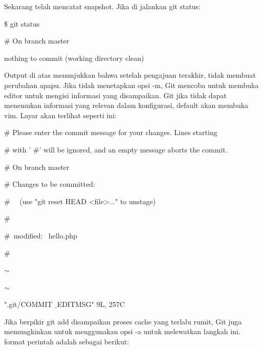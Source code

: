 \vspace{12pt}
Sekarang telah mencatat snapshot. Jika di jalankan git status:  \par
\noindent 
{\fontsize{10pt}{10pt}\selectfont  $  \$  $ git status} \par
\noindent 
{\fontsize{10pt}{10pt}\selectfont  $  \#  $ On branch master} \par
\noindent 
{\fontsize{10pt}{10pt}\selectfont nothing to commit (working directory clean)} \par
\vspace{12pt}
\hspace*{0.5in} Output di atas menunjukkan bahwa setelah pengajuan terakhir, tidak membuat perubahan apapu. Jika tidak menetapkan opsi -m, Git mencoba untuk membuka editor untuk mengisi informasi yang disampaikan. Git jika tidak dapat menemukan informasi yang relevan dalam konfigurasi, default akan membuka vim. Layar akan terlihat seperti ini:  \par
\noindent 
{\fontsize{10pt}{10pt}\selectfont  $  \#  $ Please enter the commit message for your changes. Lines starting} \par
\noindent 
{\fontsize{10pt}{10pt}\selectfont  $  \#  $ with ' $  \#  $' will be ignored, and an empty message aborts the commit.} \par
\noindent 
{\fontsize{10pt}{10pt}\selectfont  $  \#  $ On branch master} \par
\noindent 
{\fontsize{10pt}{10pt}\selectfont  $  \#  $ Changes to be committed:} \par
\noindent 
{\fontsize{10pt}{10pt}\selectfont  $  \#  $~~ (use "git reset HEAD <file>..." to unstage)} \par
\noindent 
{\fontsize{10pt}{10pt}\selectfont  $  \#  $} \par
\noindent 
{\fontsize{10pt}{10pt}\selectfont  $  \#  $~modified:~  hello.php} \par
\noindent 
{\fontsize{10pt}{10pt}\selectfont  $  \#  $} \par
\noindent 
{\fontsize{10pt}{10pt}\selectfont  $  \sim  $} \par
\noindent 
{\fontsize{10pt}{10pt}\selectfont  $  \sim  $} \par
\noindent 
{\fontsize{10pt}{10pt}\selectfont ".git/COMMIT $  \_  $EDITMSG" 9L, 257C} \par
\vspace{12pt}
\hspace*{0.5in} Jika berpikir git add disampaikan proses cache yang terlalu rumit, Git juga memungkinkan untuk menggunakan opsi -a untuk melewatkan langkah ini. format perintah adalah sebagai berikut: \par
